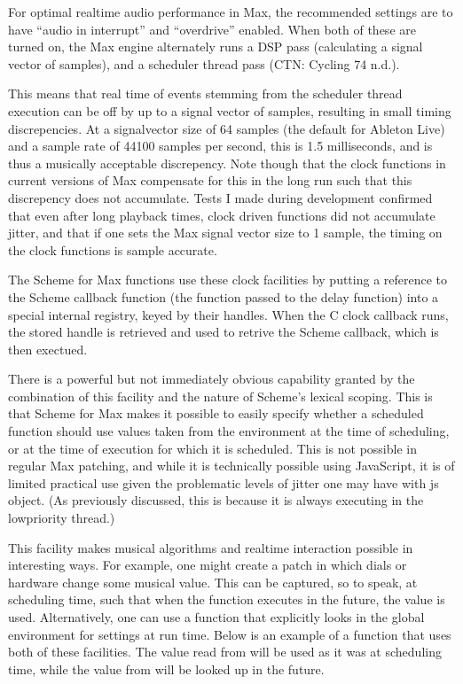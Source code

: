 \documentclass[letterpaper,10pt,english]{sphinxmanual}
\begin{document}
\sphinxAtStartPar
For optimal real\sphinxhyphen{}time audio performance in Max, the recommended
settings are to have “audio in interrupt” and “overdrive” enabled.
When both of these are turned on, the Max engine alternately runs
a DSP pass (calculating a signal vector of samples), and a scheduler
thread pass (CTN: Cycling 74 n.d.).

\sphinxAtStartPar
This means that real time of events stemming from
the scheduler thread execution can be off by up to a signal
vector of samples, resulting in small timing discrepencies.
At a signal\sphinxhyphen{}vector size of 64 samples (the default for Ableton Live) and
a sample rate of 44100 samples per second, this is 1.5 milliseconds,
and is thus a musically acceptable discrepency.
Note though that the clock functions
in current versions of Max compensate for this in the long run such
that this discrepency does not accumulate.
Tests I made during development confirmed that even after long
playback times, clock driven functions did not accumulate jitter,
and that if one sets the Max signal vector size to 1 sample,
the timing on the clock functions is sample accurate.

\sphinxAtStartPar
The Scheme for Max functions use these clock facilities by putting
a reference to the Scheme callback function (the function passed to the delay function)
into a special internal registry, keyed by their handles.
When the C clock callback runs, the stored handle is retrieved
and used to retrive the Scheme callback, which is then exectued.

\sphinxAtStartPar
There is a powerful but not immediately obvious capability granted by
the combination of this facility
and the nature of Scheme’s lexical scoping. This is that
Scheme for Max makes it possible to easily specify whether
a scheduled function should use values taken
from the environment at the time of scheduling,
or at the time of execution for which it is scheduled.
This is not possible in regular Max patching, and while it is technically
possible using JavaScript, it is of limited practical use given the
problematic levels of jitter one may have with js object.
(As previously discussed, this is because it is always executing in the low\sphinxhyphen{}priority thread.)

\sphinxAtStartPar
This facility makes musical algorithms and real\sphinxhyphen{}time interaction possible in
interesting ways. For example, one might create a patch in which
dials or hardware change some musical value. This can be captured,
so to speak, at scheduling time, such that when the function executes in the future,
the value  is used. Alternatively, one can
use a function that explicitly looks in the global environment
for settings at run time.
Below is an example of a function that uses both of these facilities.
The value read from  will be used as it was at scheduling
time, while the value from  will be looked up in the future.
\end{document}
